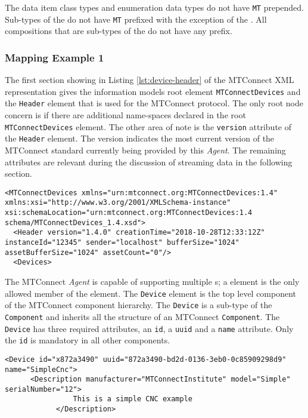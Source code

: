 The data item class types and enumeration data types do not have \texttt{MT} prepended. Sub-types of the  do not have \texttt{MT} prefixed with the exception of the . All compositions that are sub-types of the  do not have any prefix.

\subsubsection{Mapping Example 1}

The first section showing in Listing \ref{lst:device-header} of the MTConnect XML representation gives the information models root element \texttt{MTConnectDevices} and the \texttt{Header} element that is used for the MTConnect protocol. The only root node concern is if there are additional name-spaces declared in the root \texttt{MTConnectDevices} element. The other area of note is the \texttt{version} attribute of the \texttt{Header} element.  The version indicates the most current version of the MTConnect standard currently being provided by this \textit{Agent}. The remaining attributes are relevant during the discussion of streaming data in the following section.

\begin{lstlisting}[caption={Device Header},label={lst:device-header}]
<MTConnectDevices xmlns="urn:mtconnect.org:MTConnectDevices:1.4" xmlns:xsi="http://www.w3.org/2001/XMLSchema-instance" xsi:schemaLocation="urn:mtconnect.org:MTConnectDevices:1.4 schema/MTConnectDevices_1.4.xsd">
  <Header version="1.4.0" creationTime="2018-10-28T12:33:12Z" instanceId="12345" sender="localhost" bufferSize="1024" assetBufferSize="1024" assetCount="0"/>
  <Devices>
\end{lstlisting}

The MTConnect \textit{Agent} is capable of supporting multiple s; a  element is the only allowed member of the  element. The \texttt{Device} element is the top level component of the MTConnect component hierarchy. The \texttt{Device} is a sub-type of the \texttt{Component} and inherits all the structure of an MTConnect \texttt{Component}. The \texttt{Device} has three required attributes, an \texttt{id}, a \texttt{uuid} and a \texttt{name} attribute. Only the \texttt{id} is mandatory in all other components. 

\begin{lstlisting}[firstnumber=last,%
    caption={\texttt{Device} Element Mapping},label={lst:device-model-device}]
    <Device id="x872a3490" uuid="872a3490-bd2d-0136-3eb0-0c85909298d9" name="SimpleCnc">
      <Description manufacturer="MTConnectInstitute" model="Simple" serialNumber="12">
				This is a simple CNC example
			</Description>
\end{lstlisting}

